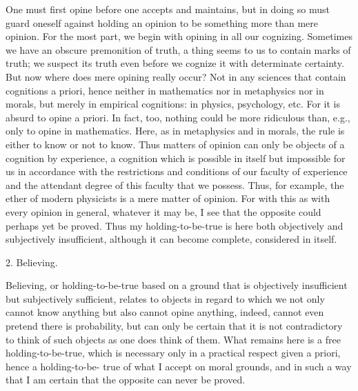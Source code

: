         One must first opine before one accepts and maintains,
        but in doing so must guard oneself against holding an opinion to be
        something more than mere opinion.
        For the most part, we begin with
        opining in all our cognizing. Sometimes we have an obscure premonition
        of truth, a thing seems to us to contain marks of truth; we suspect its truth
        even before we cognize it with determinate certainty.
        But now where does mere opining really occur?
        Not in any sciences that contain cognitions a priori,
        hence neither in mathematics nor in metaphysics nor in morals,
        but merely in empirical cognitions: in physics, psychology, etc.
        For it is absurd to opine a priori.
        In fact, too, nothing could be more ridiculous than, e.g.,
        only to opine in mathematics.
        Here, as in metaphysics and in morals,
        the rule is either to know or not to know.
        Thus matters of opinion can only be objects of a cognition by experience,
        a cognition which is possible in itself but impossible for us in accordance
        with the restrictions and conditions of our faculty of experience and the
        attendant degree of this faculty that we possess.
        Thus, for example, the ether of modern physicists is a mere matter of opinion.
        For with this as with every opinion in general, whatever it may be,
        I see that the opposite could perhaps yet be proved.
        Thus my holding-to-be-true is here both objectively and subjectively insufficient,
        although it can become complete, considered in itself.

    2. Believing.

    Believing, or holding-to-be-true based on a ground that is
    objectively insufficient but subjectively sufficient, relates to objects in
    regard to which we not only cannot know anything but also cannot opine
    anything, indeed, cannot even pretend there is probability, but can only be
    certain that it is not contradictory to think of such objects as one does
    think of them. What remains here is a free holding-to-be-true, which is
    necessary only in a practical respect given a priori, hence a holding-to-be-
    true of what I accept on moral grounds, and in such a way that I am certain
    that the opposite can never be proved.

